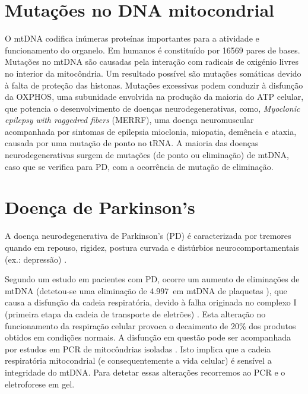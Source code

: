 \documentclass{article}
\begin{document}
    \section{Mutações no DNA mitocondrial}
    O mtDNA codifica inúmeras proteínas importantes para a atividade e funcionamento do organelo. Em humanos é constituído por 16569 pares de bases. Mutações no mtDNA são causadas pela interação com radicais de oxigénio livres no interior da mitocôndria. Um resultado possível são mutações somáticas devido à falta de proteção das histonas. Mutações excessivas podem conduzir à disfunção da OXPHOS, uma subunidade envolvida na produção da maioria do ATP celular, que potencia o desenvolvimento de doenças neurodegenerativas, como, \textit{Myoclonic epilepsy with raggedred fibers} (MERRF), uma doença neuromuscular acompanhada por sintomas de epilepsia mioclonia, miopatia, demência e ataxia, causada por uma mutação de ponto no tRNA. \cite{Velez-Bartolomei:1993aa}\cite{Zeviani:2022aa} A maioria das doenças neurodegenerativas surgem de mutações (de ponto ou eliminação) de mtDNA, caso que se verifica para PD, com a ocorrência de mutação de eliminação.
    \section{Doença de Parkinson's}
    A doença neurodegenerativa de Parkinson's (PD) é caracterizada por tremores quando em repouso, rigidez, postura curvada e distúrbios neurocomportamentais (ex.: depressão) \cite{Sofronova:2016aa}.\par
    Segundo um estudo em pacientes com PD, ocorre um aumento de eliminações de mtDNA (detetou-se uma eliminação de 4.997\,\si{} em mtDNA de plaquetas \cite{Sandy:1993aa}), que causa a disfunção da cadeia respiratória, devido à falha originada no complexo I (primeira etapa da cadeia de transporte de eletrões) \cite{Swerdlow:1996aa}. Esta alteração no funcionamento da respiração celular provoca o decaimento de 20\% dos produtos obtidos em condições normais. A disfunção em questão pode ser acompanhada por estudos em PCR de mitocôndrias isoladas \cite{Diaz:2009aa}. Isto implica que a cadeia respiratória mitocondrial (e consequentemente a vida celular) é sensível a integridade do mtDNA. Para detetar essas alterações recorremos ao PCR e o eletroforese em gel.
\end{document}
